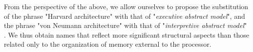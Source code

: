 From the perspective of the above, we allow ourselves to propose the substitution of the phrase "Harvard architecture" with that of "{\em executive abstract model}", and the phrase "von Neumann architecture" with that of "{\em interpretive abstract model}" . We thus obtain names that reflect more significant structural aspects than those related only to the organization of memory external to the processor.






% 
% 
% 
% 
% 
% 
